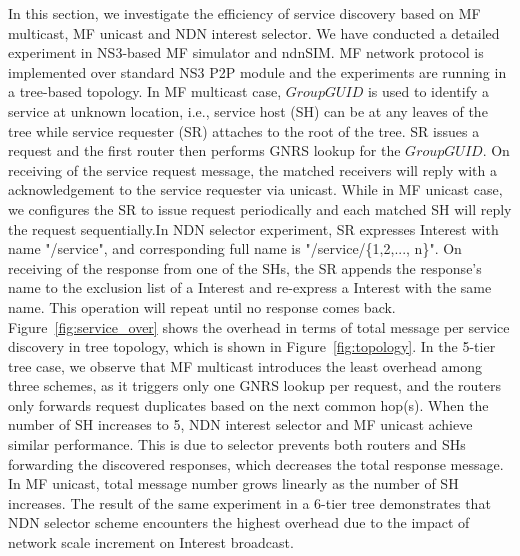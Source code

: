In this section, we investigate the efficiency of service discovery based on MF multicast, MF unicast and NDN interest selector. We have conducted a detailed experiment in NS3-based MF simulator and ndnSIM.  MF network protocol is implemented over standard NS3 P2P module and the experiments are running in a tree-based topology. In MF multicast case, $Group GUID$ is used to identify a service at unknown location, i.e., service host (SH) can be at any leaves of the tree while service requester (SR) attaches to the root of the tree. SR issues a request and the first router then performs  GNRS lookup for the $Group GUID$. On receiving of the service request message, the matched receivers will reply with a acknowledgement to the service requester via unicast. While in MF unicast case, we configures the SR to issue request periodically and each matched SH will reply the request sequentially.In NDN selector experiment,  SR expresses Interest with name "/service", and corresponding full name is "/service/\{1,2,..., n\}". On receiving of the response from one of the SHs, the SR appends the response's name to the exclusion list of a Interest and re-express a Interest with the same name. This operation will repeat until no response comes back. Figure~\ref{fig:service_over} shows the overhead in terms of total message per service discovery in tree topology, which is shown in Figure~\ref{fig:topology}. In the 5-tier tree case, we observe that MF multicast introduces the least overhead among three schemes, as it triggers only one GNRS lookup per request, and the routers only forwards request duplicates based on the next common hop(s). When the number of  SH increases to 5, NDN interest selector and MF unicast achieve similar performance. This is due to selector prevents both routers and SHs forwarding the discovered responses, which decreases the total response message. In MF unicast, total message number grows linearly as the number of SH increases. The result of the same experiment in a 6-tier tree demonstrates that NDN selector scheme encounters the highest overhead due to the impact of network scale increment on Interest broadcast. 
     


